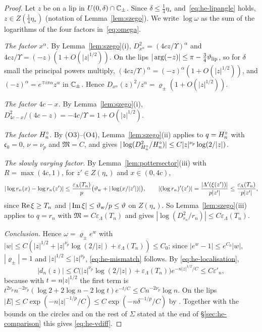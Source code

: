 \begin{proof}
Let $z$ be on a lip in $U(0,\delta)\cap\mathbb{C}_\pm$. Since $\delta\le\frac14\eta_*$ and~\eqref{eq:he-lipangle} holds, $z\in
Z(\frac14\eta_*)$ (notation of Lemma~\ref{lem:szego}). We write $\log\omega$ as the sum of the logarithms of the four
factors in~\eqref{eq:omega}.

\emph{The factor $x^\alpha$.} By Lemma~\ref{lem:szego}(i), $D_{x^\alpha}^2=(4cz/\Upsilon)^\alpha$ and
$4cz/\Upsilon=(-z)(1+O(|z|^{1/2}))$. On the lips $|\arg(-z)|\le\pi-\frac34\vartheta_{\mathrm{lip}}$, so for $\delta$ small the principal
powers multiply, $(4cz/\Upsilon)^\alpha=(-z)^\alpha(1+O(|z|^{1/2}))$, and $(-z)^\alpha=e^{\mp i\pi\alpha}z^\alpha$ in $\mathbb{C}_\pm$.
Hence $D_{x^\alpha}(z)^2/z^\alpha=\varrho_\pm(1+O(|z|^{1/2}))$.

\emph{The factor $4c-x$.} By Lemma~\ref{lem:szego}(i), $D_{4c-x}^2/(4c-z)=-4c/\Upsilon=1+O(|z|^{1/2})$.

\emph{The factor $H^{\circ}_n$.} By (O3)--(O4), Lemma~\ref{lem:szego}(ii) applies to $q=H^{\circ}_n$ with $\mathfrak c_0=0$, $\nu=\nu_p$ and
$\mathfrak M=C$, and gives $|\log(D_{H^{\circ}_n}^2/H^{\circ}_n)|\le C|z|^{\nu_p}\log(2/|z|)$.

\emph{The slowly varying factor.} By Lemma~\ref{lem:pottersector}(iii) with $R=\max(4c,1)$, for $z'\in Z(\eta_*)$ and
$x\in(0,4c)$,
\[
  |\log r_n(x)-\log r_n(z')|\le\frac{\varepsilon_\Lambda(T_n)}p\bigl(\vartheta_{\mathrm{w}}+|\log(x/|z'|)|\bigr),\qquad
  |(\log r_n)'(z')|=\frac{|\Lambda'(\xi(z'))|}{p|z'|}\le\frac{\varepsilon_\Lambda(T_n)}{p|z'|},
\]
since $\operatorname{Re}\xi\ge T_n$ and $|\operatorname{Im}\xi|\le\vartheta_{\mathrm{w}}/p\le\vartheta$ on $Z(\eta_*)$. So Lemma~\ref{lem:szego}(iii) applies to $q=r_n$
with $\mathfrak M=C\varepsilon_\Lambda(T_n)$ and gives $|\log(D_{r_n}^2/r_n)|\le C\varepsilon_\Lambda(T_n)$.

\emph{Conclusion.} Hence $\omega=\varrho_\pm e^{w}$ with
$|w|\le C(|z|^{1/2}+|z|^{\nu_p}\log(2/|z|)+\varepsilon_\Lambda(T_n))\le C_0$; since $|e^w-1|\le e^{C_0}|w|$, $|\varrho_\pm|=1$
and $|z|^{1/2}\le|z|^{\nu_p}$, \eqref{eq:he-mismatch} follows. By \eqref{eq:he-localisation},
\[
  |d_n(z)|\le C\bigl(|z|^{\nu_p}\log(2/|z|)+\varepsilon_\Lambda(T_n)\bigr)e^{-n|z|^{1/2}/C}\le C\varepsilon'_n,
\]
because with $t=n|z|^{1/2}$ the first term is $t^{2\nu_p}n^{-2\nu_p}(\log2+2\log n-2\log t)e^{-t/C}\le Cn^{-2\nu_p}\log n$.
On the lips $|E|\le C\exp(-n|z|^{-1/p}/C)\le C\exp(-n\delta^{-1/p}/C)$ by . Together with the bounds on the circles and
on the rest of $\Sigma$ stated at the end of \S\ref{sec:he-comparison} this gives \eqref{eq:he-vdiff}.
\end{proof}


